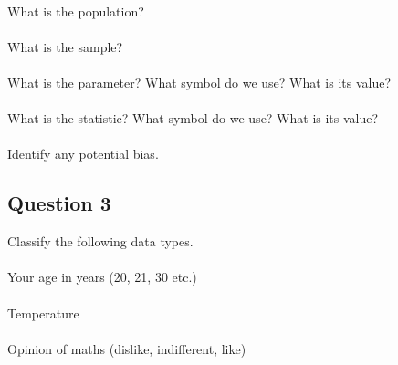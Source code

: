 \documentclass[12pt]{article}
\begin{document}
\hspace{-1.8cm}{\bf a.}\vspace{-0.5cm}\\
What is the population?\\[-0.3cm]

\hspace{-1.8cm}{\bf b.}\vspace{-0.5cm}\\
What is the sample?\\[-0.3cm]

\hspace{-1.8cm}{\bf c.}\vspace{-0.5cm}\\
What is the parameter? What symbol do we use? What is its value?\\[-0.3cm]

\hspace{-1.8cm}{\bf d.}\vspace{-0.5cm}\\
What is the statistic? What symbol do we use? What is its value?\\[-0.3cm]

\hspace{-1.8cm}{\bf e.}\vspace{-0.5cm}\\
Identify any potential bias.\\[-0.3cm]


\subsection*{Question 3}
Classify the following data types.\\

\hspace{-1.8cm}{\bf a.}\vspace{-0.5cm}\\
Your age in years (20, 21, 30 etc.)\\[-0.3cm]

\hspace{-1.8cm}{\bf a.}\vspace{-0.5cm}\\
Temperature\\[-0.3cm]

\hspace{-1.8cm}{\bf b.}\vspace{-0.5cm}\\
Opinion of maths (dislike, indifferent, like)\\[-0.3cm]
\end{document}

